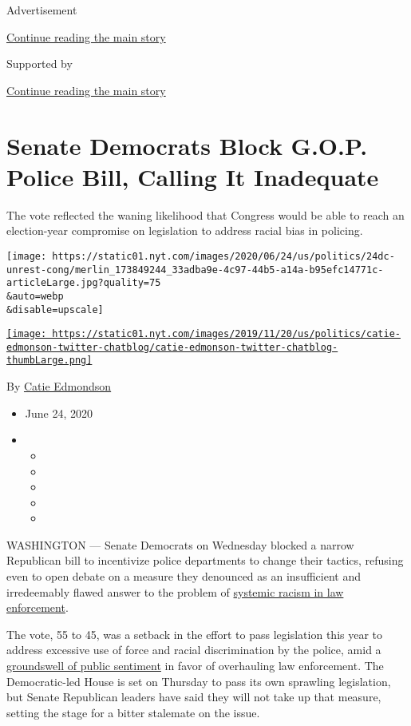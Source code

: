 Advertisement

\protect\hyperlink{after-top}{Continue reading the main story}

Supported by

\protect\hyperlink{after-sponsor}{Continue reading the main story}

\hypertarget{senate-democrats-block-gop-police-bill-calling-it-inadequate}{%
\section{Senate Democrats Block G.O.P. Police Bill, Calling It
Inadequate}\label{senate-democrats-block-gop-police-bill-calling-it-inadequate}}

The vote reflected the waning likelihood that Congress would be able to
reach an election-year compromise on legislation to address racial bias
in policing.

\texttt{[image: https://static01.nyt.com/images/2020/06/24/us/politics/24dc-unrest-cong/merlin\_173849244\_33adba9e-4c97-44b5-a14a-b95efc14771c-articleLarge.jpg?quality=75\\\&auto=webp\\\&disable=upscale]}

\href{https://www.nytimes.com/by/catie-edmondson}{\texttt{[image: https://static01.nyt.com/images/2019/11/20/us/politics/catie-edmonson-twitter-chatblog/catie-edmonson-twitter-chatblog-thumbLarge.png]}}

By \href{https://www.nytimes.com/by/catie-edmondson}{Catie Edmondson}

\begin{itemize}
\item
  June 24, 2020
\item
  \begin{itemize}
  \item
  \item
  \item
  \item
  \item
  \end{itemize}
\end{itemize}

WASHINGTON --- Senate Democrats on Wednesday blocked a narrow Republican
bill to incentivize police departments to change their tactics, refusing
even to open debate on a measure they denounced as an insufficient and
irredeemably flawed answer to the problem of
\href{https://www.nytimes.com/2020/05/30/us/derek-chauvin-george-floyd.html}{systemic
racism in law enforcement}.

The vote, 55 to 45, was a setback in the effort to pass legislation this
year to address excessive use of force and racial discrimination by the
police, amid a
\href{https://www.nytimes.com/interactive/2020/05/30/us/george-floyd-protest-photos.html}{groundswell
of public sentiment} in favor of overhauling law enforcement. The
Democratic-led House is set on Thursday to pass its own sprawling
legislation, but Senate Republican leaders have said they will not take
up that measure, setting the stage for a bitter stalemate on the issue.

